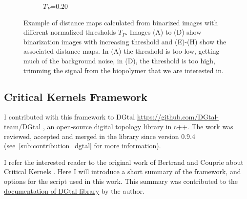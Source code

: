 \begin{figure}[H]
\begin{minipage}{0.5\textwidth}
\begin{subfigure}{0.5\textwidth}
    \caption{$T_P$=0.20}
    \label{dist014}
  \end{subfigure}
\end{minipage}
\caption[Distance map - Actin]{Example of distance maps calculated from binarized images
with different normalized thresholds $T_P$. Images (A) to (D) show binarization images with increasing threshold and (E)-(H) show the associated distance maps. In (A) the threshold is too low, getting much of the background noise, in (D), the threshold is too high, trimming the signal from the biopolymer that we are interested in.}
\label{fig:distancemap}
\end{figure}

\subsection{Critical Kernels Framework}%
\label{sub:critical_kernels_framework}

    I contributed with this framework to DGtal \url{https://github.com/DGtal-team/DGtal} \cite{david_coeurjolly_dgtal-team/dgtal:_2018}, an open-source digital topology
    library in c++.
    The work was reviewed, accepted and merged in the library since version 0.9.4 (see~\ref{sub:contribution_dgtal} for more information).

I refer the interested reader to the original work of Bertrand and Couprie about Critical Kernels \cite{bertrand_parallel_2017}. Here I will introduce a short summary of the framework, and options for the script used in this work. This summary was contributed to the \href{https://dgtal.org/doc/nightly/moduleVoxelComplex.html}{documentation of DGtal library} by the author.

